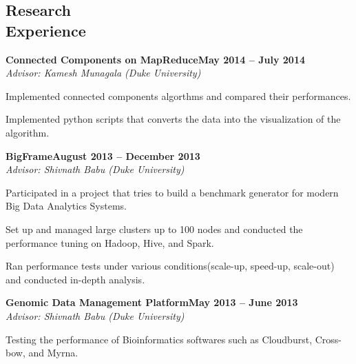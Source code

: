 \documentclass[11pt,margin,line]{cv}
\begin{document}
\begin{resume}
    \section{\mysidestyle Research\\Experience}
    \textbf{Connected Components on MapReduce}\hfill \textbf{May 2014 -- July 2014} \vspace{1mm}\\\vspace{0mm}%
    \textsl{Advisor: Kamesh Munagala (Duke University)}
    \vspace{-2mm}\\\vspace{-1mm}%
    \begin{list3}
        \item Implemented connected components algorthms and compared their performances.
        \item Implemented python scripts that converts the data into the visualization of the algorithm.
    \end{list3}
    \textbf{BigFrame}\hfill \textbf{August 2013 -- December 2013} \vspace{1mm}\\\vspace{0mm}%
    \textsl{Advisor: Shivnath Babu (Duke University)}
    \vspace{-2mm}\\\vspace{-1mm}%
    \begin{list3}
      \item Participated in a project that tries to build a benchmark generator for modern Big Data Analytics Systems.
      \item Set up and managed large clusters up to 100 nodes and conducted the performance tuning on Hadoop, Hive, and Spark.
      \item Ran performance tests under various conditions(scale-up, speed-up, scale-out) and conducted in-depth analysis.
    \end{list3}
    \textbf{Genomic Data Management Platform}\hfill \textbf{May 2013 -- June 2013} \vspace{1mm}\\\vspace{0mm}%
    \textsl{Advisor: Shivnath Babu (Duke University)}
    \vspace{-2mm}\\\vspace{-1mm}%
    \begin{list3}
        \item Testing the performance of Bioinformatics softwares such as Cloudburst, Cross-bow, and Myrna.
    \end{list3}


\end{resume}
\end{document}
